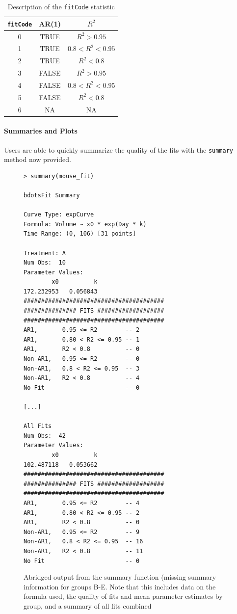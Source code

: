 \documentclass{article}
\newcommand{\xt}{\texttt}%
\begin{document}
\begin{singlespace}
\begin{table}[H]
\centering
\def\arraystretch{1.5}
\begin{tabular}{|c|c|c|}
\hline
\xt{fitCode} & AR(1) & $R^2$ \\
\hline
0 & TRUE & $R^2 > 0.95$ \\
1 & TRUE & $0.8 < R^2 < 0.95$ \\
2 & TRUE & $ R^2 <0.8$ \\
3 & FALSE & $R^2 >0.95$ \\
4 & FALSE & $0.8 < R^2 < 0.95$ \\
5 & FALSE &$ R^2 <0.8$  \\
6 & NA & NA \\
\hline
\end{tabular}
\caption{Description of the \xt{fitCode} statistic}
\label{tab:fit_codes}
\end{table}
\end{singlespace}


\paragraph{Summaries and Plots}

Users are able to quickly summarize the quality of the fits with the \xt{summary} method now provided. 

\begin{singlespace}
\begin{figure}[H]
\centering
\begin{BVerbatim}
> summary(mouse_fit)

bdotsFit Summary

Curve Type: expCurve 
Formula: Volume ~ x0 * exp(Day * k) 
Time Range: (0, 106) [31 points]

Treatment: A 
Num Obs:  10 
Parameter Values: 
        x0          k 
172.232953   0.056843 
########################################
############### FITS ###################
########################################
AR1,       0.95 <= R2        -- 2 
AR1,       0.80 < R2 <= 0.95 -- 1 
AR1,       R2 < 0.8          -- 0 
Non-AR1,   0.95 <= R2        -- 0 
Non-AR1,   0.8 < R2 <= 0.95  -- 3 
Non-AR1,   R2 < 0.8          -- 4 
No Fit                       -- 0 

[...]

All Fits 
Num Obs:  42 
Parameter Values: 
        x0          k 
102.487118   0.053662 
########################################
############### FITS ###################
########################################
AR1,       0.95 <= R2        -- 4 
AR1,       0.80 < R2 <= 0.95 -- 2 
AR1,       R2 < 0.8          -- 0 
Non-AR1,   0.95 <= R2        -- 9 
Non-AR1,   0.8 < R2 <= 0.95  -- 16 
Non-AR1,   R2 < 0.8          -- 11 
No Fit                       -- 0 
\end{BVerbatim}
\caption{Abridged output from the summary function (missing summary information for groups B-E. Note that this includes data on the formula used, the quality of fits and mean parameter estimates by group, and a summary of all fits combined}
\end{figure}
\end{singlespace}
\end{document}
